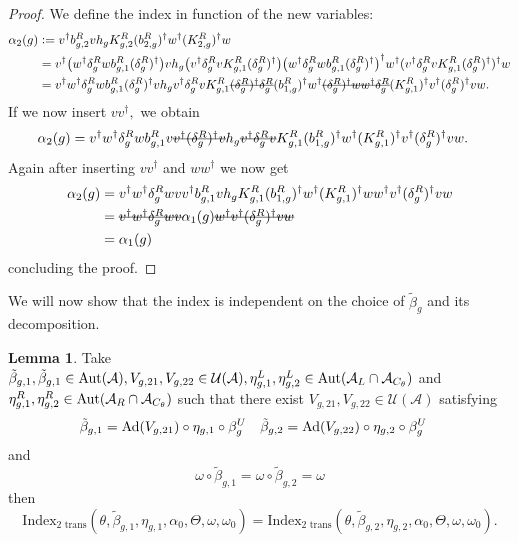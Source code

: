 \documentclass[12pt,a4paper,twoside]{article}
\newcommand{\stkout}[1]{\ifmmode\text{\sout{\ensuremath{#1}}}\else\sout{#1}\fi}
\newcommand{\defeq}{\vcentcolon=}
\let\originalleft\left
\let\originalright\right
\renewcommand{\left}{\mathopen{}\mathclose\bgroup\originalleft}
\renewcommand{\right}{\aftergroup\egroup\originalright}
\newcommand{\UU}{\mathcal U}
\renewcommand{\AA}{\mathcal A}
\newcommand{\Ad}[1]{\textrm{Ad}\left(#1\right)}
\newcommand{\Aut}[1]{\textrm{Aut}\left(#1\right)}
\theoremstyle{definition}
\newtheorem{lemma}[theorem]{Lemma}
\numberwithin{equation}{section}
\begin{document}
\begin{proof}
	We define the index in function of the new variables:
	\begin{align}
		\alpha_2(g)&\defeq v^\dagger b^R_{g,2}v h_g K^R_{g,2}(b^R_{2,g})^\dagger w^\dagger (K^R_{2,g})^\dagger w\\
		&=v^\dagger \left(w^\dagger\delta^R_g w b_{g,1}^R (\delta^R_g)^\dagger\right) v h_g \left(v^\dagger \delta_g^R v K_{g,1}^R (\delta_g^R)^\dagger\right) \left(w^\dagger\delta^R_g w b_{g,1}^R (\delta^R_g)^\dagger\right)^\dagger w^\dagger (v^\dagger \delta_g^R v K_{g,1}^R (\delta_g^R)^\dagger)^\dagger w\\
		&=v^\dagger w^\dagger\delta^R_g w b_{g,1}^R (\delta^R_g)^\dagger v h_g v^\dagger \delta_g^R v K_{g,1}^R \stkout{(\delta_g^R)^\dagger \delta_g^R} (b_{1,g}^R)^\dagger w^\dagger \stkout{(\delta_g^R)^\dagger w w^\dagger \delta_g^R} (K_{g,1}^R)^\dagger v^\dagger (\delta_g^R)^\dagger v  w.
	\end{align}
	If we now insert $vv^\dagger,$ we obtain
	\begin{align}
		\alpha_2(g)&=v^\dagger w^\dagger\delta^R_g w b_{g,1}^R v\stkout{v^\dagger (\delta^R_g)^\dagger v} h_g \stkout{v^\dagger \delta_g^R v} K_{g,1}^R (b_{1,g}^R)^\dagger w^\dagger (K_{g,1}^R)^\dagger v^\dagger (\delta_g^R)^\dagger v  w.
	\end{align}
	Again after inserting $vv^\dagger$ and $ww^\dagger$ we now get
	\begin{align}
		\alpha_2(g)&=v^\dagger w^\dagger\delta^R_g w v v^\dagger b_{g,1}^R v h_g K_{g,1}^R (b_{1,g}^R)^\dagger w^\dagger (K_{g,1}^R)^\dagger ww^\dagger v^\dagger (\delta_g^R)^\dagger v  w\\
		&=\stkout{v^\dagger w^\dagger\delta^R_g w v} \alpha_1(g) \stkout{w^\dagger v^\dagger (\delta_g^R)^\dagger v  w}\\
		&=\alpha_1(g)
	\end{align}
	concluding the proof.
\end{proof}
We will now show that the index is independent on the choice of $\tilde{\beta}_g$ and its decomposition.
\begin{lemma}\label{lem:InvarianceUnderChoiceBetaTwoTranslations}
	Take $\tilde{\beta}_{g,1},\tilde{\beta}_{g,1}\in\Aut{\AA},V_{g,21},V_{g,22}\in\UU(\AA),\eta_{g,1}^L,\eta_{g,2}^L\in \Aut{\AA_L\cap\AA_{C_\theta}}$ and $\eta_{g,1}^R,\eta_{g,2}^R\in \Aut{\AA_R\cap\AA_{C_\theta}}$ such that there exist $V_{g,21},V_{g,22}\in\UU(\AA)$ satisfying
	\begin{align}\label{eq:InvarianceUnderChoiceBetaTwoBetasTwoTranslations}
		\tilde{\beta}_{g,1}&=\Ad{V_{g,21}}\circ\eta_{g,1}\circ\beta^U_g&\tilde{\beta}_{g,2}&=\Ad{V_{g,22}}\circ\eta_{g,2}\circ\beta^U_g
	\end{align}
	and
	\begin{equation}
		\omega\circ\tilde{\beta}_{g,1}=\omega\circ\tilde{\beta}_{g,2}=\omega
	\end{equation}
	then
	\begin{equation}
		\textrm{Index}_{\text{2 trans}}(\theta,\tilde{\beta}_{g,1},\eta_{g,1},\alpha_{0},\Theta,\omega,\omega_0)=\textrm{Index}_{\text{2 trans}}(\theta,\tilde{\beta}_{g,2},\eta_{g,2},\alpha_{0},\Theta,\omega,\omega_0).
	\end{equation}
\end{lemma}
\end{document}
